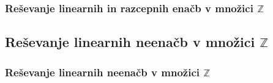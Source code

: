         \begin{frame}
            \frametitle{Reševanje linearnih in razcepnih enačb v množici $\mathbb{Z}$}
        \end{frame}

    \subsection{Reševanje linearnih neenačb v množici $\mathbb{Z}$}

        \begin{frame}
            \frametitle{Reševanje linearnih neenačb v množici $\mathbb{Z}$}
        \end{frame}
